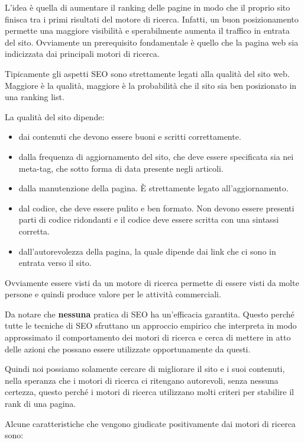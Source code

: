 L'idea è quella di aumentare il ranking delle pagine in modo che il proprio sito finisca tra i primi risultati del motore di ricerca.
Infatti, un buon posizionamento permette una maggiore visibilità e sperabilmente aumenta il traffico in entrata del sito.
Ovviamente un prerequisito fondamentale è quello che la pagina web sia indicizzata dai principali motori di ricerca.

Tipicamente gli aspetti SEO sono strettamente legati alla qualità del sito web. Maggiore è la qualità, maggiore è la probabilità che il sito sia ben posizionato in una ranking list.

La qualità del sito dipende:

\begin{itemize}
	\item dai contenuti che devono essere buoni e scritti correttamente.
	\item dalla frequenza di aggiornamento del sito, che deve essere specificata sia nei meta-tag, che sotto forma di data presente negli articoli.
	\item dalla manutenzione della pagina. \`E strettamente legato all'aggiornamento.
	\item dal codice, che deve essere pulito e ben formato. Non devono essere presenti parti di codice ridondanti e il codice deve essere scritta con una sintassi corretta.
	\item dall'autorevolezza della pagina, la quale dipende dai link che ci sono in entrata verso il sito.
\end{itemize}

Ovviamente essere visti da un motore di ricerca permette di essere visti da molte persone e quindi produce valore per le attività commerciali.

Da notare che \textbf{nessuna} pratica di SEO ha un'efficacia garantita.
Questo perché tutte le tecniche di SEO sfruttano un approccio empirico che interpreta in modo approssimato il comportamento dei motori di ricerca e cerca di mettere in atto delle azioni che possano essere utilizzate opportunamente da questi.

Quindi noi possiamo solamente cercare di migliorare il sito e i suoi contenuti, nella speranza che i motori di ricerca ci ritengano autorevoli, senza nessuna certezza, questo perché i motori di ricerca utilizzano molti criteri per stabilire il rank di una pagina.

Alcune caratteristiche che vengono giudicate positivamente dai motori di ricerca sono:

